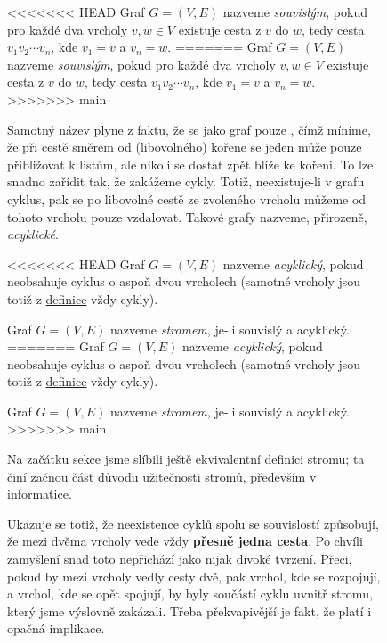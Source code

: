 \begin{figure}[h]
\begin{definition}
<<<<<<< HEAD
	\label{def:souvisly-graf}
	Graf $G = (V,E)$ nazveme \emph{souvislým}, pokud pro každé dva vrcholy $v,w \in
		V$ existuje cesta z $v$ do $w$, tedy cesta $v_1v_2 \cdots v_n$, kde $v_1 = v$ a
	$v_n = w$.
=======
\label{def:souvisly-graf}
 Graf $G = (V,E)$ nazveme \emph{souvislým}, pokud pro každé dva vrcholy $v,w \in
 V$ existuje cesta z $v$ do $w$, tedy cesta $v_1v_2 \cdots v_n$, kde $v_1 = v$ a
 $v_n = w$.
>>>>>>> main
\end{definition}

Samotný název  plyne z faktu, že se jako graf pouze , čímž
míníme, že při cestě směrem od (libovolného) kořene se jeden může pouze
přibližovat k listům, ale nikoli se dostat zpět blíže ke kořeni. To lze snadno
zařídit tak, že zakážeme cykly. Totiž, neexistuje-li v grafu cyklus, pak se po
libovolné cestě ze zvoleného vrcholu můžeme od tohoto vrcholu pouze vzdalovat.
Takové grafy nazveme, přirozeně, \emph{acyklické}.

\begin{definition}
<<<<<<< HEAD
	\label{def:acyklicky-graf}
	Graf $G = (V,E)$ nazveme \emph{acyklický}, pokud neobsahuje cyklus o aspoň dvou
	vrcholech (samotné vrcholy jsou totiž z \hyperref[def:cyklus]{definice} vždy
	cykly).
\end{definition}

\begin{definition}[Strom]
	\label{def:strom}
	Graf $G = (V,E)$ nazveme \emph{stromem}, je-li souvislý a acyklický.
=======
\label{def:acyklicky-graf}
 Graf $G = (V,E)$ nazveme \emph{acyklický}, pokud neobsahuje cyklus o aspoň dvou
 vrcholech (samotné vrcholy jsou totiž z \hyperref[def:cyklus]{definice} vždy
 cykly).
\end{definition}

\begin{definition}[Strom]
\label{def:strom}
 Graf $G = (V,E)$ nazveme \emph{stromem}, je-li souvislý a acyklický.
>>>>>>> main
\end{definition}

Na začátku sekce jsme slíbili ještě ekvivalentní definici stromu; ta činí začnou
část důvodu užitečnosti stromů, především v informatice.

Ukazuje se totiž, že neexistence cyklů spolu se souvislostí způsobují, že mezi
dvěma vrcholy vede vždy \textbf{přesně jedna cesta}. Po chvíli zamyšlení snad
toto nepřichází jako nijak divoké tvrzení. Přeci, pokud by mezi vrcholy vedly
cesty dvě, pak vrchol, kde se rozpojují, a vrchol, kde se opět spojují, by byly
součástí cyklu uvnitř stromu, který jsme výslovně zakázali. Třeba překvapivější
je fakt, že platí i opačná implikace.


\end{figure}
